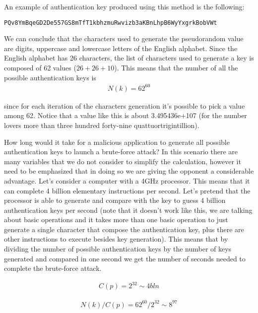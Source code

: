 \documentclass[a4paper,10pt]{memoir}
\begin{document}
An example of authentication key produced using this method is the following: 
\begin{lstlisting}
PQv8YmBqeGD2De557GS8mTfT1kbhzmuRwvizb3aKBnLhpB6WyYxgrkBobVWt
\end{lstlisting}

We can conclude that the characters used to generate the pseudorandom value are digits, uppercase and lowercase letters of the English alphabet. Since the English alphabet has 26 characters, the list of characters used to generate a key is composed of 62 values ($26 + 26 + 10$). This means that the number of all the possible authentication keys is 
\begin{align}
N(k) = 62^{60}
\end{align}

since for each iteration of the characters generation it's possible to pick a value among 62. Notice that a value like this is about 3.495436e+107 (for the number lovers more than three hundred forty-nine quattuortrigintillion). 

How long would it take for a malicious application to generate all possible authentication keys to launch a brute-force attack? In this scenario there are many variables that we do not consider to simplify the calculation, however it need to be emphasized that in doing so we are giving the opponent a considerable advantage. Let's consider a computer with a 4GHz processor. This means that it can complete 4 billion elementary instructions per second. Let's pretend that the processor is able to generate and compare with the key to guess 4 billion authentication keys per second (note that it doesn't work like this, we are talking about basic operations and it takes more than one basic operation to just generate a single character that compose the authentication key, plus there are other instructions to execute besides key generation). This means that by dividing the number of possible authentication keys by the number of keys generated and compared in one second we get the number of seconds needed to complete the brute-force attack.

\begin{align}
C(p) = 2^{32} \sim 4 bln
\end{align}

\begin{align}
N(k)/C(p) = 62^{60} / 2^{32} \sim 8^{97}
\end{align}
\end{document}
